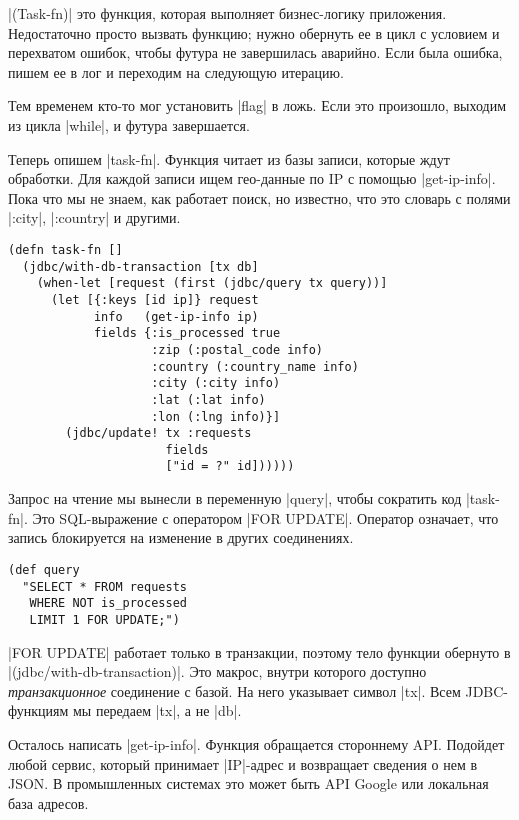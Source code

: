 \spverb|(Task-fn)| это функция, которая выполняет бизнес-логику
приложения. Недостаточно просто вызвать функцию; нужно обернуть ее в цикл с
условием и перехватом ошибок, чтобы футура не завершилась аварийно. Если была
ошибка, пишем ее в лог и переходим на следующую итерацию.

Тем временем кто-то мог установить \spverb|flag| в ложь. Если это произошло,
выходим из цикла \spverb|while|, и футура завершается.

Теперь опишем \spverb|task-fn|. Функция читает из базы записи, которые ждут
обработки. Для каждой записи ищем гео-данные по IP с помощью
\spverb|get-ip-info|. Пока что мы не знаем, как работает поиск, но известно, что
это словарь с полями \spverb|:city|, \spverb|:country| и другими.

\begin{verbatim}
(defn task-fn []
  (jdbc/with-db-transaction [tx db]
    (when-let [request (first (jdbc/query tx query))]
      (let [{:keys [id ip]} request
            info   (get-ip-info ip)
            fields {:is_processed true
                    :zip (:postal_code info)
                    :country (:country_name info)
                    :city (:city info)
                    :lat (:lat info)
                    :lon (:lng info)}]
        (jdbc/update! tx :requests
                      fields
                      ["id = ?" id])))))
\end{verbatim}

Запрос на чтение мы вынесли в переменную \spverb|query|, чтобы сократить код
\spverb|task-fn|. Это SQL-выражение с оператором \spverb|FOR UPDATE|. Оператор
означает, что запись блокируется на изменение в других соединениях.

\begin{verbatim}
(def query
  "SELECT * FROM requests
   WHERE NOT is_processed
   LIMIT 1 FOR UPDATE;")
\end{verbatim}

\spverb|FOR UPDATE| работает только в транзакции, поэтому тело функции обернуто
в \spverb|(jdbc/with-db-transaction)|. Это макрос, внутри которого доступно
\emph{транзакционное} соединение с базой. На него указывает символ
\spverb|tx|. Всем JDBC-функциям мы передаем \spverb|tx|, а не \spverb|db|.

Осталось написать \spverb|get-ip-info|. Функция обращается стороннему
API. Подойдет любой сервис, который принимает \spverb|IP|-адрес и возвращает
сведения о нем в JSON. В промышленных системах это может быть API Google или
локальная база адресов.


